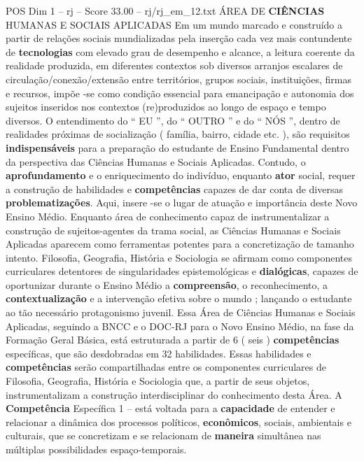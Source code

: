 \begin{textsample}{POS Dim 1 – rj – Score 33.00 – rj/rj\_em\_12.txt}  \label{ex:f1_pos_276}
ÁREA DE \textbf{CIÊNCIAS} HUMANAS E SOCIAIS APLICADAS Em um mundo marcado e construído a partir de relações sociais mundializadas pela inserção cada vez mais contundente de \textbf{tecnologias} com elevado grau de desempenho e alcance, a leitura coerente da realidade produzida, em diferentes contextos sob diversos arranjos escalares de circulação/conexão/extensão entre territórios, grupos sociais, instituições, firmas e recursos, impõe -se como condição essencial para emancipação e autonomia dos sujeitos inseridos nos contextos (re)produzidos ao longo de espaço e tempo diversos.
O entendimento do “ EU ”, do “ OUTRO ” e do “ NÓS ”, dentro de realidades próximas de socialização ( família, bairro, cidade etc. ), são requisitos \textbf{indispensáveis} para a preparação do estudante de Ensino Fundamental dentro da perspectiva das Ciências Humanas e Sociais Aplicadas.
Contudo, o \textbf{aprofundamento} e o enriquecimento do indivíduo, enquanto \textbf{ator} social, requer a construção de habilidades e \textbf{competências} capazes de dar conta de diversas \textbf{problematizações}.
Aqui, insere -se o lugar de atuação e importância deste Novo Ensino Médio.
Enquanto área de conhecimento capaz de instrumentalizar a construção de sujeitos-agentes da trama social, as Ciências Humanas e Sociais Aplicadas aparecem como ferramentas potentes para a concretização de tamanho intento.
Filosofia, Geografia, História e Sociologia se afirmam como componentes curriculares detentores de singularidades epistemológicas e \textbf{dialógicas}, capazes de oportunizar durante o Ensino Médio a \textbf{compreensão}, o reconhecimento, a \textbf{contextualização} e a intervenção efetiva sobre o mundo ; lançando o estudante ao tão necessário protagonismo juvenil.
Essa Área de Ciências Humanas e Sociais Aplicadas, seguindo a BNCC e o DOC-RJ para o Novo Ensino Médio, na fase da Formação Geral Básica, está estruturada a partir de 6 ( seis ) \textbf{competências} específicas, que são desdobradas em 32 habilidades.
Essas habilidades e \textbf{competências} serão compartilhadas entre os componentes curriculares de Filosofia, Geografia, História e Sociologia que, a partir de seus objetos, instrumentalizam a construção interdisciplinar do conhecimento desta Área.
A \textbf{Competência} Específica 1 – está voltada para a \textbf{capacidade} de entender e relacionar a dinâmica dos processos políticos, \textbf{econômicos}, sociais, ambientais e culturais, que se concretizam e se relacionam de \textbf{maneira} simultânea nas múltiplas possibilidades espaço-temporais.

\end{textsample}
